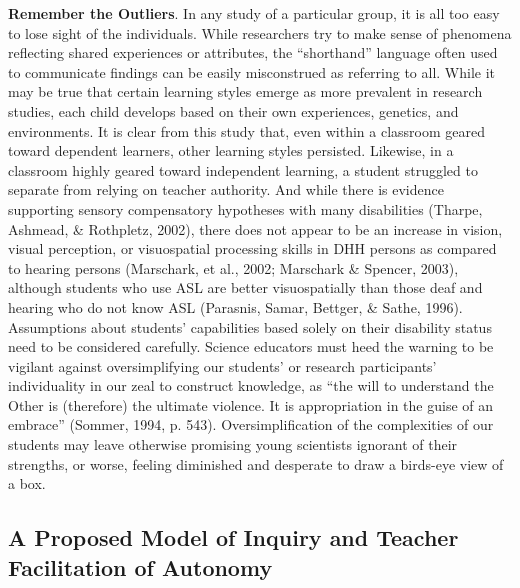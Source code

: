 \documentclass[11.5pt]{sig-alternate} %
\begin{document}
\begin{large}
\textbf{Remember the Outliers}. In any study of a particular group, it is all too easy to lose sight of the individuals.  While researchers try to make sense of phenomena reflecting shared experiences or attributes, the “shorthand” language often used to communicate findings can be easily misconstrued as referring to all.  While it may be true that certain learning styles emerge as more prevalent in research studies, each child develops based on their own experiences, genetics, and environments.  It is clear from this study that, even within a classroom geared toward dependent learners, other learning styles persisted.  Likewise, in a classroom highly geared toward independent learning, a student struggled to separate from relying on teacher authority.  And while there is evidence supporting sensory compensatory hypotheses with many disabilities (Tharpe, Ashmead, \& Rothpletz, 2002), there does not appear to be an increase in vision, visual perception, or visuospatial processing skills in DHH persons as compared to hearing persons (Marschark, et al., 2002; Marschark \& Spencer, 2003), although students who use ASL are better visuospatially than those deaf and hearing who do not know ASL (Parasnis, Samar, Bettger, \& Sathe, 1996). Assumptions about students’ capabilities based solely on their disability status need to be considered carefully.  Science educators must heed the warning to be vigilant against oversimplifying our students’ or research participants’ individuality in our zeal to construct knowledge, as “the will to understand the Other is (therefore) the ultimate violence. It is appropriation in the guise of an embrace” (Sommer, 1994, p. 543).  Oversimplification of the complexities of our students may leave otherwise promising young scientists ignorant of their strengths, or worse, feeling diminished and desperate to draw a birds-eye view of a box.

\subsection*{A Proposed Model of Inquiry and Teacher Facilitation of Autonomy}


\end{large}
\end{document}
